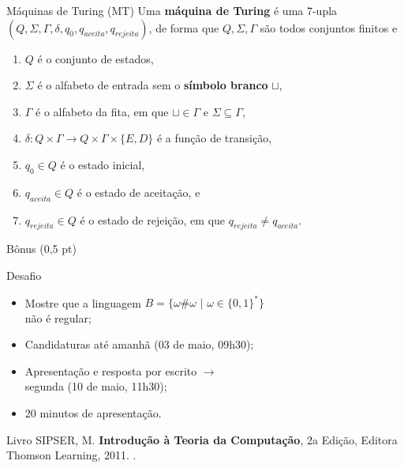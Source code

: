 \documentclass[xcolor=dvipsnames,table]{beamer}
\begin{document}
	\begin{frame}{Máquinas de Turing (MT)}
		Uma {\bf máquina de Turing} é uma 7-upla $(Q, \Sigma, \Gamma, \delta, q_0, q_{aceita}, q_{rejeita})$, de forma que $Q, \Sigma, \Gamma$ são todos conjuntos finitos e

		\begin{enumerate}
			\item $Q$ é o conjunto de estados,
			\item $\Sigma$ é o alfabeto de entrada sem o {\bf símbolo branco} $\sqcup$,
			\item $\Gamma$ é o alfabeto da fita, em que $\sqcup \in \Gamma$ e $\Sigma \subseteq \Gamma$,
			\item $\delta : Q \times \Gamma \rightarrow Q \times \Gamma \times \{E, D\}$ é a função de transição,
			\item $q_0 \in Q$ é o estado inicial,
			\item $q_{aceita} \in Q$ é o estado de aceitação, e
			\item $q_{rejeita} \in Q$ é o estado de rejeição, em que $q_{rejeita} \not= q_{aceita}$.
		\end{enumerate}
	\end{frame}
	
	\begin{frame}{Bônus (0,5 pt)}
		\begin{block}{Desafio}
			\begin{itemize}
				\item Mostre que a linguagem $B = \{ \omega \# \omega \mbox{ | } \omega \in \{ 0, 1 \}^* \}$ \\não é regular; \pause
                \item Candidaturas até amanhã (03 de maio, 09h30); \pause
                \item Apresentação e resposta por escrito $\rightarrow$ \\segunda (10 de maio, 11h30); \pause
                \item 20 minutos de apresentação.
			\end{itemize}
		\end{block} \pause
        \begin{block}{Livro}
			SIPSER, M. {\bf Introdução à Teoria da Computação}, 2a Edição, Editora Thomson Learning, 2011. \color{blue}{\bf Código Bib.: [004 SIP/int]}.
		\end{block}
	\end{frame}
	
	\begin{frame}
		\titlepage
	\end{frame}
	
\end{document}

